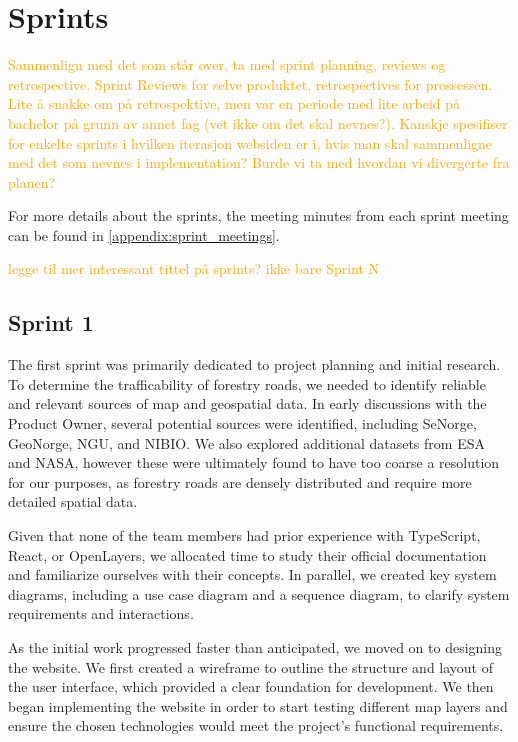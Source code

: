 \section{Sprints}

\textcolor{orange}{Sammenlign med det som står over, ta med sprint planning, reviews og retrospective. Sprint Reviews for selve produktet, retrospectives for prossessen. Lite å snakke om på retrospektive, men var en periode med lite arbeid på bachelor på grunn av annet fag (vet ikke om det skal nevnes?). Kanskje spesifiser for enkelte sprints i hvilken iterasjon websiden er i, hvis man skal sammenligne med det som nevnes i implementation? Burde vi ta med hvordan vi divergerte fra planen?}

For more details about the sprints, the meeting minutes from each sprint meeting can be found in \autoref{appendix:sprint_meetings}.

\textcolor{orange}{legge til mer interessant tittel på sprints? ikke bare Sprint N}

\subsection*{Sprint 1}

The first sprint was primarily dedicated to project planning and initial research.  To determine the trafficability of forestry roads, we needed to identify reliable and relevant sources of map and geospatial data. In early discussions with the Product Owner, several potential sources were identified, including SeNorge, GeoNorge, NGU, and NIBIO. We also explored additional datasets from ESA and NASA, however these were ultimately found to have too coarse a resolution for our purposes, as forestry roads are densely distributed and require more detailed spatial data.

Given that none of the team members had prior experience with TypeScript, React, or OpenLayers, we allocated time to study their official documentation and familiarize ourselves with their concepts. In parallel, we created key system diagrams, including a use case diagram and a sequence diagram, to clarify system requirements and interactions. 

As the initial work progressed faster than anticipated, we moved on to designing the website. We first created a wireframe to outline the structure and layout of the user interface, which provided a clear foundation for development. We then began implementing the website in order to start testing different map layers and ensure the chosen technologies would meet the project's functional requirements.

